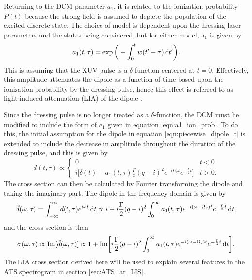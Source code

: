 Returning to the DCM parameter $a_1$, it is related to the ionization probability $P(t)$ because the strong field is assumed to deplete the population of the excited discrete state.  The choice of model is dependent upon the dressing laser parameters and the states being considered, but for either model, $a_1$ is given by 
\begin{equation}
\label{eqn:a1_ion_prob}
	a_1(t,\tau) = \exp\bigg(-\int_{0}^{t}w(t' - \tau)\mathop{}\!\mathrm{d} t'\bigg).
\end{equation}
This is assuming that the XUV pulse is a $\delta$-function centered at $t=0$.  Effectively, this amplitude attenuates the dipole as a function of time based upon the ionization probability by the dressing pulse, hence this effect is referred to as light-induced attenuation (LIA) of the dipole \cite{chiniSubcycleAcStark2012,chiniCharacterizationApplicationIsolated2012,liaoProbingAutoionizingStates2017}.

Since the dressing pulse is no longer treated as a $\delta$-function, the DCM must be modified to include the form of $a_1$ given in equation \ref{eqn:a1_ion_prob}.  To do this, the initial assumption for the dipole in equation \ref{eqn:piecewise_dipole_t} is extended to include the decrease in amplitude throughout the duration of the dressing pulse, and this is given by
\begin{equation}
\label{eqn:piecewise_dipole_finite_tp}
	d(t, \tau)\propto
	\begin{cases}
		0 & t<0\\
		i\bigg[\delta(t) + a_1(t,\tau)\frac{\Gamma}{2}(q-i)^2 e^{-i\Omega_r t}e^{-\frac{\Gamma}{2}t} \bigg] & t>0.
	\end{cases}
\end{equation}
The cross section can then be calculated by Fourier transforming the dipole and taking the imaginary part.  The dipole in the frequency domain is given by
\begin{equation}
\label{eqn:sigma_a1_finite}
	\tilde{d}(\omega,\tau) = \int_{-\infty}^{\infty}d(t,\tau)e^{i\omega t}\mathop{}\!\mathrm{d} t \propto i + i\frac{\Gamma}{2}(q-i)^2 \int_{0}^{\infty}a_1(t,\tau)e^{-i(\omega - \Omega_r) t}e^{-\frac{\Gamma}{2}t}\mathop{}\!\mathrm{d} t,
\end{equation}
and the cross section is then
\begin{equation}
\label{eqn:cross_section_a1_finite}
	\sigma(\omega,\tau) \propto \mathrm{Im}[\tilde{d}(\omega,\tau)] \propto 1 +\mathrm{Im}\bigg[i\frac{\Gamma}{2}(q-i)^2 \int_{0}^{\infty}a_1(t,\tau)e^{-i(\omega - \Omega_r) t}e^{-\frac{\Gamma}{2}t}\mathop{}\!\mathrm{d} t\bigg].
\end{equation}
The LIA cross section derived here will be used to explain several features in the ATS spectrogram in section \ref{sec:ATS_ar_LIS}. 

